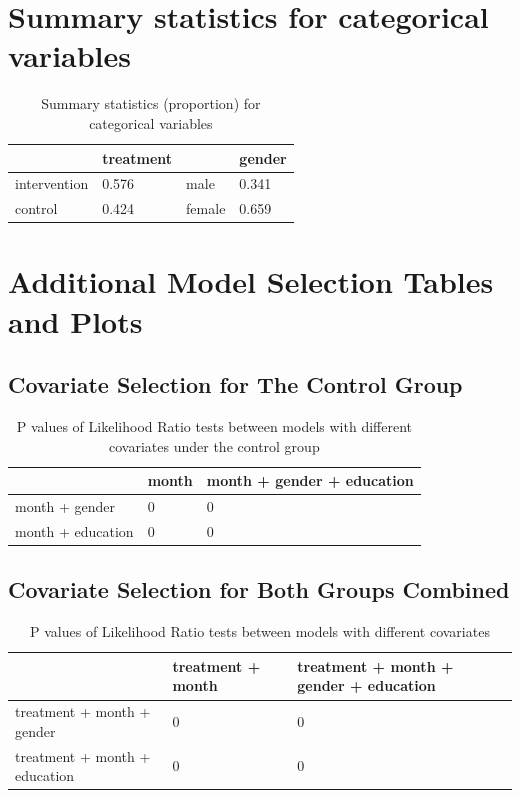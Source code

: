

\section{Summary statistics for categorical variables}

\begin{table}[H]
\centering
\begin{tabular}{|l|l|l|l|}
\hline
& treatment & & gender\\
\hline
intervention & 0.576 & male & 0.341 \\
\hline
control & 0.424 & female & 0.659\\
\hline
\end{tabular}
\caption{Summary statistics (proportion) for categorical variables}
\label{tab:summ.stat.cat}
\end{table}

\section{Additional Model Selection Tables and Plots}
\subsection{Covariate Selection for The Control Group}\label{app:cov.control}
\begin{table}[H]
\centering
\begin{tabular}{|l|l|l|}
\hline
& month & month + gender + education \\
\hline
month + gender & 0 & 0 \\
\hline
month + education & 0 & 0 \\
\hline
\end{tabular}
\caption{P values of Likelihood Ratio tests between models with different covariates under the control group}
\label{tab:model.comp.control.lrt}
\end{table}
\subsection{Covariate Selection for Both Groups Combined}\label{app:cov.both}
\begin{table}[H]
\centering
\begin{tabular}{|l|l|l|}
\hline
& treatment + month & treatment + month + gender + education \\
\hline
treatment + month + gender & 0 & 0 \\
\hline
treatment + month + education & 0 & 0 \\
\hline
\end{tabular}
\caption{P values of Likelihood Ratio tests between models with different covariates}
\label{tab:model.comp.lrt}
\end{table}
